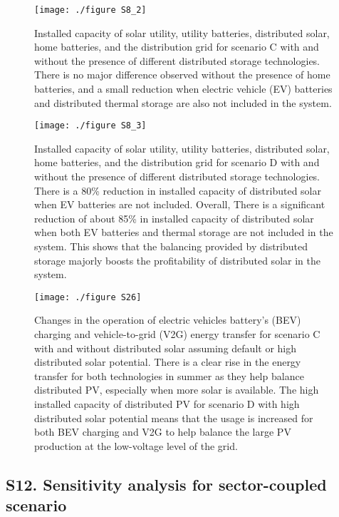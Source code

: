 	\begin{figure}[H]
		\renewcommand*{\thefigure}{S\arabic{figure}}
		
		\texttt{[image: ./figure S8\_2]}
		\caption{Installed capacity of solar utility, utility batteries, distributed solar, home batteries, and the distribution grid for scenario C with and without the presence of different distributed storage technologies. There is no major difference observed without the presence of home batteries, and a small reduction when electric vehicle (EV) batteries and distributed thermal storage are also not included in the system. }
	\end{figure}
	
	\begin{figure}[H]
		\renewcommand*{\thefigure}{S\arabic{figure}}
		
		\texttt{[image: ./figure S8\_3]}
		\caption{Installed capacity of solar utility, utility batteries, distributed solar, home batteries, and the distribution grid for scenario D with and without the presence of different distributed storage technologies. There is a 80\% reduction in installed capacity of distributed solar when EV batteries are not included. Overall, There is a significant reduction of about 85\% in installed capacity of distributed solar when both EV batteries and thermal storage are not included in the system. This shows that the balancing provided by distributed storage majorly boosts the profitability of distributed solar in the system.}
	\end{figure}
	
	\begin{figure}[H]
		\renewcommand*{\thefigure}{S\arabic{figure}}
		
		\texttt{[image: ./figure S26]}
		\caption{Changes in the operation of electric vehicles battery's (BEV) charging and vehicle-to-grid (V2G) energy transfer for scenario C with and without distributed solar assuming default or high distributed solar potential. There is a clear rise in the energy transfer for both technologies in summer as they help balance distributed PV, especially when more solar is available. The high installed capacity of distributed PV for scenario D with high distributed solar potential means that the usage is increased for both BEV charging and V2G to help balance the large PV production at the low-voltage level of the grid. }
	\end{figure}
	
	
	\subsection*{S12. Sensitivity analysis for sector-coupled scenario}
	
